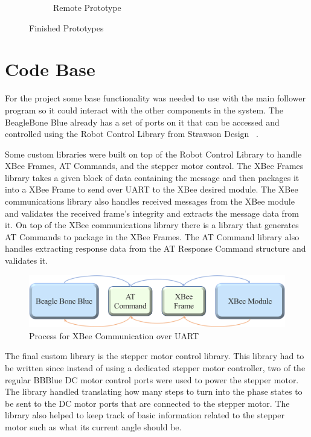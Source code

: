 \begin{figure}[H]
\begin{subfigure}[t]{0.35\textwidth}
        \captionsetup{width=\textwidth}
        \caption{Remote Prototype}
        \label{fig:remotePrototype}
    \end{subfigure}
    \caption{Finished Prototypes}
    \label{fig:finishedPrototypes}
\end{figure}


\section{Code Base}
\label{sec:Code Base}

For the project some base functionality was needed to use with the main follower program so it could interact with the other components in the system. The BeagleBone Blue already has a set of ports on it that can be accessed and controlled using the Robot Control Library from Strawson Design ~\cite{Robot_Control_Library}.

\vspace*{12pt}
\noindent
Some custom libraries were built on top of the Robot Control Library to handle XBee Frames, AT Commands, and the stepper motor control. The XBee Frames library takes a given block of data containing the message and then packages it into a XBee Frame to send over UART to the XBee desired module. The XBee communications library also handles received messages from the XBee module and validates the received frame's integrity and extracts the message data from it. On top of the XBee communications library there is a library that generates AT Commands to package in the XBee Frames. The AT Command library also handles extracting response data from the AT Response Command structure and validates it.

\begin{figure}[H]
  \centering
  \includegraphics[width=\textwidth]{figs/img/Command Process Diagram.png}
  \caption{Process for XBee Communication over UART}
  \label{fig:CommandProcessDiagram}
\end{figure}

\vspace*{12pt}
\noindent
The final custom library is the stepper motor control library. This library had to be written since instead of using a dedicated stepper motor controller, two of the regular BBBlue DC motor control ports were used to power the stepper motor. The library handled translating how many steps to turn into the phase states to be sent to the DC motor ports that are connected to the stepper motor. The library also helped to keep track of basic information related to the stepper motor such as what its current angle should be.

